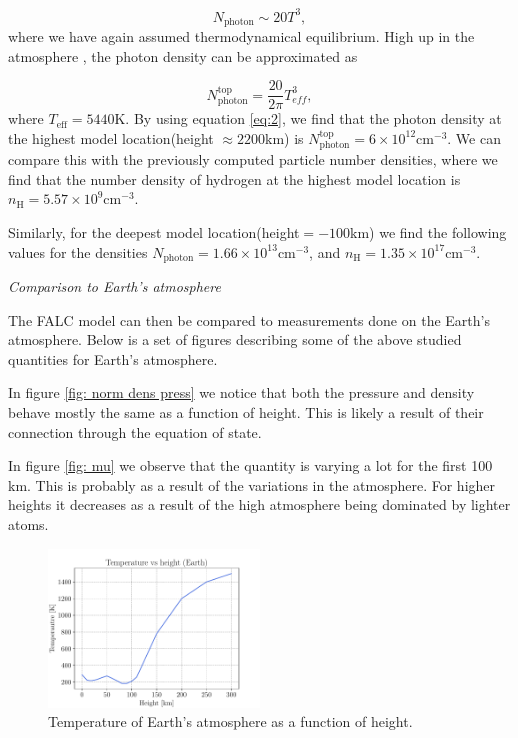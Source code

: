 \documentclass[a4paper,11.5pt,]{article}
\begin{document}
\begin{multicols}{2}
\begin{equation}\label{eq:1}
    N_\mathrm{photon} \sim 20T^3,
\end{equation}
where we have again assumed thermodynamical equilibrium. High up in the atmosphere , the photon density can be approximated as 

\begin{equation}\label{eq:2}
    N_\mathrm{photon}^{\mathrm{top}} = \frac{20}{2\pi}T_{eff}^3,
\end{equation}
where $T_\mathrm{eff} = 5440$K. By using equation \eqref{eq:2}, we find that the photon density at the highest model location(height $\approx 2200$km) is $N_\mathrm{photon}^{\mathrm{top}} = 6 \times 10^{12}$cm$^{-3}$. We can compare this with the previously computed particle number densities, where we find that the number density of hydrogen at the highest model location is $n_\mathrm{H} = 5.57 \times 10^9$cm$^{-3}$. 

Similarly, for the deepest model location(height$ = -100$km) we find the following values for the densities $N_\mathrm{photon} = 1.66 \times 10^{13}$cm$^{-3}$, and $n_\mathrm{H} = 1.35 \times 10^{17}$cm$^{-3}$.

\begin{center}
    \textit{Comparison to Earth's atmosphere}
\end{center}

The FALC model can then be compared to measurements done on the Earth's atmosphere. Below is a set of figures describing some of the above studied quantities for Earth's atmosphere.

In figure \ref{fig: norm dens press} we notice that both the pressure and density behave mostly the same as a function of height. This is likely a result of their connection through the equation of state.

In figure \ref{fig: mu} we observe that the quantity is varying a lot for the first 100 km. This is probably as a result of the variations in the atmosphere. For higher heights it decreases as a result of the high atmosphere being dominated by lighter atoms. 

\begin{figure}[H]
    \centering
    \includegraphics[width = 0.5\textwidth]{figures/1.3/Earth_temperature.pdf}
    \caption{Temperature of Earth's atmosphere as a function of height.}
    \label{fig: earth temp}
\end{figure}


\end{multicols}
\end{document}
